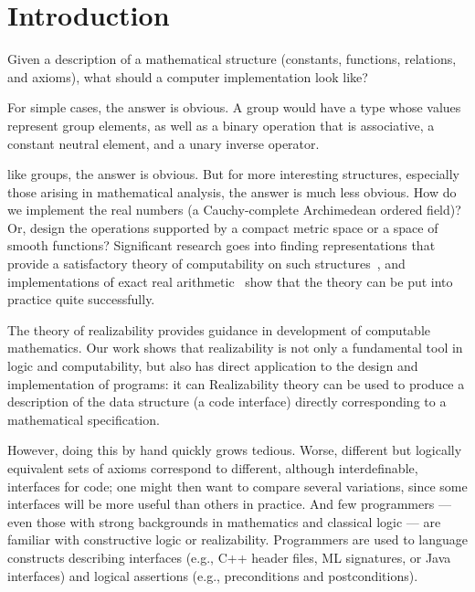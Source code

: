 \section{Introduction}
\label{sec:introduction}

Given a description of a mathematical structure (constants,
functions, relations, and axioms), what should a computer
implementation look like?

For simple cases,
\iflong
the answer is obvious. A
group would have a type whose values represent group elements, as well
as a binary operation that is associative, a constant 
neutral element, and a unary inverse operator.

\else %
like groups, the answer is obvious.
\fi %
%
But for more interesting structures, especially those arising in
mathematical analysis, the answer is much less obvious. How do we
implement the real numbers (a Cauchy-complete Archimedean ordered
field)? Or, design the operations supported by a compact metric
space or a space of smooth functions? Significant research goes into
finding representations that provide a satisfactory theory of
computability on such structures~\cite{Wei00,TZ98,Bla97,EL00}, and
implementations of exact real arithmetic~\cite{Mue00,Lam05a} show that
the theory can be put into practice quite successfully.

\iflong
The theory of realizability provides guidance in development of
computable mathematics.  Our work shows that realizability is
not only  a
fundamental tool in logic and computability, but also
has direct application to the design and implementation of programs:
it can
\else %
Realizability theory can be used to 
\fi %
produce a description of the data structure (a code interface)
directly corresponding to a mathematical specification.
%
\iflong

\fi %
%
However, doing this by hand quickly grows tedious. 
\iflong
Worse, different
but logically equivalent sets of axioms correspond to different,
although interdefinable, interfaces for code; one might then want to
compare several variations, since some interfaces will be more useful
than others in practice.
\fi %
And few programmers --- even those with strong backgrounds in
mathematics and classical logic --- are familiar with constructive logic or
realizability. 
\iflong
Programmers are used to language constructs
describing interfaces (e.g., C++ header files, ML signatures, or Java
interfaces) and logical assertions (e.g., preconditions
and postconditions).
\fi

